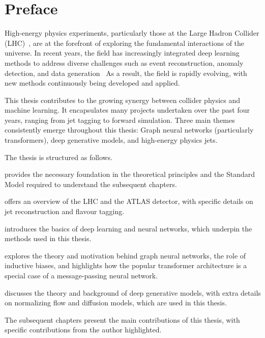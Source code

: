 \chapter{Preface}
\label{ch:intro}

High-energy physics experiments, particularly those at the Large Hadron Collider (LHC)~\cite{LHCMachine}, are at the forefront of exploring the fundamental interactions of the universe.
In recent years, the field has increasingly integrated deep learning methods to address diverse challenges such as event reconstruction, anomaly detection, and data generation~\cite{Albertsson:2018maf}
As a result, the field is rapidly evolving, with new methods continuously being developed and applied.

This thesis contributes to the growing synergy between collider physics and machine learning.
It encapsulates many projects undertaken over the past four years, ranging from jet tagging to forward simulation.
Three main themes consistently emerge throughout this thesis: Graph neural networks (particularly transformers), deep generative models, and high-energy physics jets.

The thesis is structured as follows.

 provides the necessary foundation in the theoretical principles and the Standard Model required to understand the subsequent chapters.

 offers an overview of the LHC and the ATLAS detector, with specific details on jet reconstruction and flavour tagging.

 introduces the basics of deep learning and neural networks, which underpin the methods used in this thesis.

 explores the theory and motivation behind graph neural networks, the role of inductive biases, and highlights how the popular transformer architecture is a special case of a message-passing neural network.

 discusses the theory and background of deep generative models, with extra details on normalizing flow and diffusion models, which are used in this thesis.

The subsequent chapters present the main contributions of this thesis, with specific contributions from the author highlighted.

